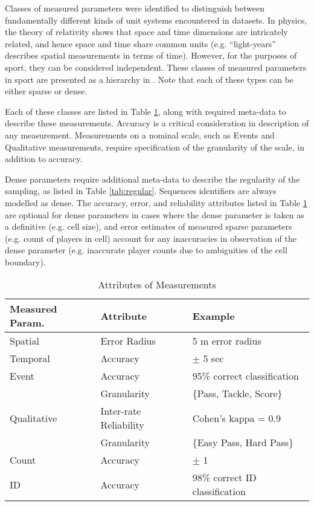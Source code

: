 Classes of measured parameters were identified to distinguish between
fundamentally different kinds of unit systems encountered in datasets.
In physics, the theory of relativity shows that space and time
dimensions are intricately related, and hence space and time share
common units (e.g. ``light-years'' describes spatial measurements in
terms of time). However, for the purposes of sport, they can be considered independent. These classes of measured parameters in sport are presented as a hierarchy in .
Note that each of these types can be either sparse or dense.


Each of these classes are listed in Table \ref{tab:irregular}, along with
required meta-data to describe these measurements. Accuracy is a
critical consideration in description of any measurement. Measurements
on a nominal scale, such as Events and Qualitative measurements, require
specification of the granularity of the scale, in addition to accuracy.


Dense parameters require additional meta-data to describe the
regularity of the sampling, as listed in Table \ref{tab:regular}. Sequences identifiers are always modelled as dense.
The accuracy, error, and reliability attributes listed in Table \ref{tab:irregular} are optional for dense parameters in cases where
the dense parameter is taken as a definitive (e.g. cell size), and error estimates of measured sparse parameters (e.g. count of players in cell) account for any inaccuracies in observation of the dense parameter (e.g. inaccurate player counts due to ambiguities of the cell boundary).

\begin{table}[h]
\caption{Attributes of Measurements}
\label{tab:irregular}
\begin{tabular}{lll}
\toprule
Measured Param. & Attribute & Example\tabularnewline
\midrule
Spatial & Error Radius & 5 m error radius\tabularnewline
Temporal & Accuracy & $\pm$ 5 sec\tabularnewline
Event & Accuracy & 95\% correct classification\tabularnewline
& Granularity & \{Pass, Tackle, Score\}\tabularnewline
Qualitative & Inter-rate Reliability & Cohen's kappa =
0.9\tabularnewline
& Granularity & \{Easy Pass, Hard Pass\}\tabularnewline
Count & Accuracy & $\pm$ 1\tabularnewline
ID & Accuracy & 98\% correct ID classification\tabularnewline
\bottomrule
\end{tabular}
\end{table}

